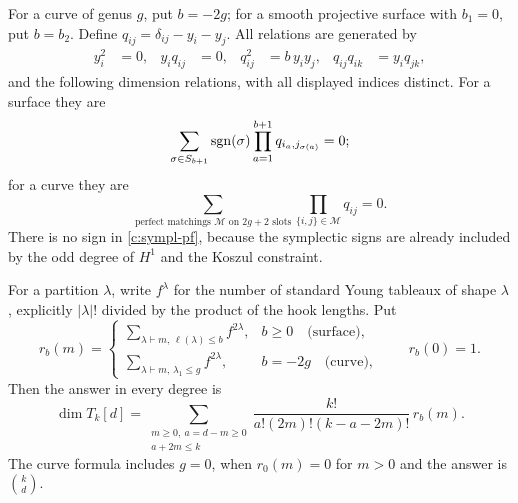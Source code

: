 \begin{theorem}[Dimensions for curves and for surfaces with $b_1=0$]
\label{c:pair-ranks}
For a curve of genus $g$, put $b=-2g$; for a smooth projective surface with $b_1=0$, put $b=b_2$. Define $q_{ij}=\delta_{ij}-y_i-y_j$. All relations are generated by
\begin{align}
 y_i^2&=0,&y_iq_{ij}&=0,&q_{ij}^2&=b\,y_iy_j,&q_{ij}q_{ik}&=y_iq_{jk},\label{c:pair-local}
\end{align}
and the following dimension relations, with all displayed indices distinct. For a surface they are
\begin{equation}
\label{c:orth-det}
 \sum_{\sigma\in S_{b+1}}\operatorname{sgn}(\sigma)
   \prod_{a=1}^{b+1}q_{i_a,j_{\sigma(a)}}=0;
\end{equation}
for a curve they are
\begin{equation}
\label{c:sympl-pf}
 \sum_{\text{perfect matchings }\mathcal M\text{ on }2g+2\text{ slots}}
       \prod_{\{i,j\}\in\mathcal M}q_{ij}=0.
\end{equation}
There is no sign in \eqref{c:sympl-pf}, because the symplectic signs are already included by the odd degree of $H^1$ and the Koszul constraint.

For a partition $\lambda$, write $f^\lambda$ for the number of standard Young tableaux of shape $\lambda$, explicitly $|\lambda|!$ divided by the product of the hook lengths. Put
\[
 r_b(m)=
 \begin{cases}
 \displaystyle\sum_{\lambda\vdash m,\,\ell(\lambda)\leq b} f^{2\lambda},&b\geq0\quad\text{(surface)},\\[4pt]
 \displaystyle\sum_{\lambda\vdash m,\,\lambda_1\leq g} f^{2\lambda},&b=-2g\quad\text{(curve)},
 \end{cases}
 \qquad r_b(0)=1.
\]
Then the answer in every degree is
\begin{equation}
\label{c:dimension-pair}
 \dim T_k[d]=
 \sum_{\substack{m\geq0,\ a=d-m\geq0\\a+2m\leq k}}
 \frac{k!}{a!(2m)!(k-a-2m)!}\,r_b(m).
\end{equation}
The curve formula includes $g=0$, when $r_0(m)=0$ for $m>0$ and the answer is $\binom{k}{d}$.
\end{theorem}

